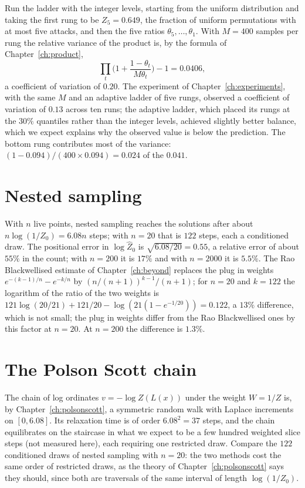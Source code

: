 Run the ladder with the integer levels, starting from the uniform distribution and taking the first rung to be $Z_5 = 0.649$, the fraction of uniform permutations with at most five attacks, and then the five ratios $\theta_5, \dots, \theta_1$. With $M = 400$ samples per rung the relative variance of the product is, by the formula of Chapter~\ref{ch:product},
\[
\prod_{t} \Big( 1 + \frac{1 - \theta_t}{M \theta_t} \Big) - 1 = 0.0406 ,
\]
a coefficient of variation of $0.20$. The experiment of Chapter~\ref{ch:experiments}, with the same $M$ and an adaptive ladder of five rungs, observed a coefficient of variation of $0.13$ across ten runs; the adaptive ladder, which placed its rungs at the $30\%$ quantiles rather than the integer levels, achieved slightly better balance, which we expect explains why the observed value is below the prediction. The bottom rung contributes most of the variance: $(1 - 0.094) / (400 \times 0.094) = 0.024$ of the $0.041$.

\section{Nested sampling}

With $n$ live points, nested sampling reaches the solutions after about $n \log(1/Z_0) = 6.08 n$ steps; with $n = 20$ that is $122$ steps, each a conditioned draw. The positional error in $\log \hat Z_0$ is $\sqrt{6.08 / 20} = 0.55$, a relative error of about $55\%$ in the count; with $n = 200$ it is $17\%$ and with $n = 2000$ it is $5.5\%$. The Rao Blackwellised estimate of Chapter~\ref{ch:beyond} replaces the plug in weights $e^{-(k-1)/n} - e^{-k/n}$ by $(n/(n+1))^{k-1}/(n+1)$; for $n = 20$ and $k = 122$ the logarithm of the ratio of the two weights is $121 \log(20/21) + 121/20 - \log(21 (1 - e^{-1/20})) = 0.122$, a $13\%$ difference, which is not small; the plug in weights differ from the Rao Blackwellised ones by this factor at $n = 20$. At $n = 200$ the difference is $1.3\%$.

\section{The Polson Scott chain}

The chain of log ordinates $v = -\log Z(L(x))$ under the weight $W = 1/Z$ is, by Chapter~\ref{ch:polsonscott}, a symmetric random walk with Laplace increments on $[0, 6.08]$. Its relaxation time is of order $6.08^2 = 37$ steps, and the chain equilibrates on the staircase in what we expect to be a few hundred weighted slice steps (not measured here), each requiring one restricted draw. Compare the $122$ conditioned draws of nested sampling with $n = 20$: the two methods cost the same order of restricted draws, as the theory of Chapter~\ref{ch:polsonscott} says they should, since both are traversals of the same interval of length $\log(1/Z_0)$.

